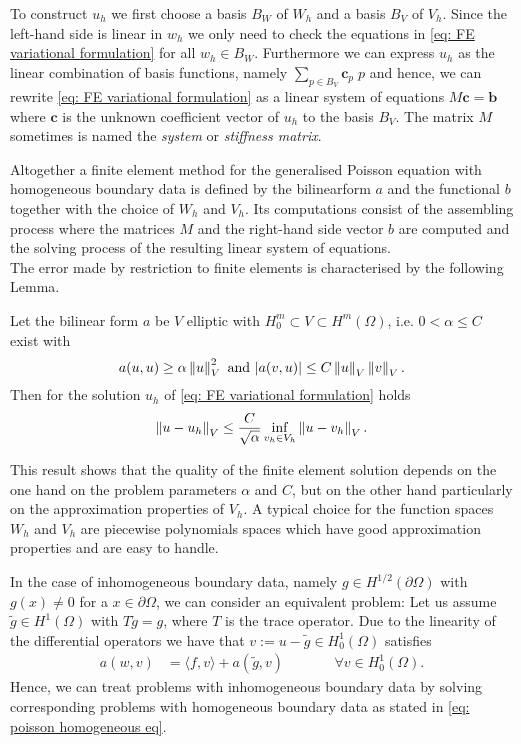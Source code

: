 To construct $u_h$ we first choose a basis $B_W$ of $W_h$ and a basis $B_V$ of $V_h$.
Since the left-hand side is linear in $w_h$ we only need to check the equations in \eqref{eq: FE variational formulation} for all $w_h \in B_W$. 
Furthermore we can express $u_h$ as the linear combination of basis functions, namely $\sum_{p \in B_V} \mathbf{c}_p \; p$ and hence, we can rewrite \eqref{eq: FE variational formulation} as a linear system of equations $M \mathbf{c} = \mathbf{b}$ where  $\mathbf{c}$ is the unknown coefficient vector of $u_h$ to the basis $B_V$.  The matrix $M$ sometimes is named the \emph{system} or \emph{stiffness matrix}.

Altogether a finite element method for the generalised Poisson equation with homogeneous boundary data is defined by the bilinearform $a$ and the functional $b$ together with the choice of $W_h$ and $V_h$. Its computations consist of the assembling process where the matrices $M$ and the right-hand side vector $b$ are computed and the solving process of the resulting linear system of equations.\\
The error made by restriction to finite elements is characterised by the following Lemma.
\begin{lemma} \label{la: Ceas lemma}
	Let the bilinear form $a$ be $V$ elliptic with $H_0^m \subset V \subset H^m(\Omega) $, i.e. $0 < \alpha \leq C$ exist with
	\[
		a(u,u) \geq \alpha  \left\lVert u \right\rVert ^2_V \text{ and } |a(v,u)| \leq C \left\lVert u \right\rVert _V \left\lVert v \right\rVert _V.
	\]
	Then for the solution $u_h$ of \eqref{eq: FE variational formulation}  holds
	\begin{align}
		\left\lVert u - u_h \right\rVert_V \leq \frac C {\sqrt \alpha} \inf\limits_{v_h \in V_h} \left\lVert u-v_h \right\rVert_V.
	\end{align}
\end{lemma}
This result shows that the quality of the finite element solution depends on the one hand on the problem parameters $\alpha$ and $C$, but on the other hand particularly on the approximation properties of $V_h$. A typical choice for the function spaces $W_h$ and $V_h$ are piecewise polynomials spaces which have good approximation properties and are easy to handle.

In the case of inhomogeneous boundary data, namely $g\in H^{1/ 2}(\partial \Omega)$ with $g(x) \neq 0$ for a $x \in \partial \Omega$, we can consider an equivalent problem: Let us assume $\tilde g \in H^1(\Omega)$ with $T\tilde g = g$, where $T$ is the trace operator. Due to the linearity of the differential operators we have that $v:=u-\tilde g \in H^1_0(\Omega)$ satisfies
\begin{align}
		a(w,v) &= \langle f,v \rangle + a(\tilde g, v) \qquad &&\forall v \in H_0^1(\Omega). \label{eq: poisson homogeneous eq} %
\end{align}
Hence, we can treat problems with inhomogeneous boundary data by solving corresponding problems with homogeneous boundary data as stated in \eqref{eq: poisson homogeneous eq}.

